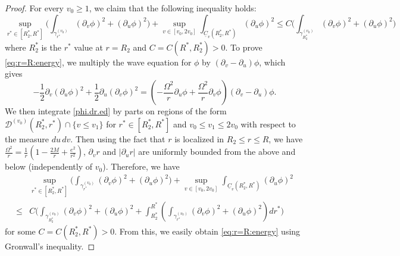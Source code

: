 \documentclass[12 pt, reqno]{amsart}
\theoremstyle{definition}
\theoremstyle{remark}
\numberwithin{equation}{section}
\newcommand{\set}[1]{\{#1\}}
\newcommand{\rd}{\partial}
\newcommand{\bb}{\Big}
\newcommand{\0}{\emptyset}
\newcommand{\gmm}{\gamma}
\newcommand{\Omg}{\Omega}
\newcommand{\calD}{\mathcal D}
\newcommand{\uC}{\underline{C}}
\begin{document}
\begin{proof}
For every $v_{0} \geq 1$, we claim that the following inequality holds:
\begin{equation} \label{eq:r=R:energy}
	\sup_{r^{\ast} \in [R_{2}^{\ast}, R^{\ast}]} \bb( \int_{\gmm^{(v_{0})}_{r^{\ast}}} (\rd_{v} \phi)^{2} + (\rd_{u} \phi)^{2} \bb)
	+ \sup_{v \in [v_{0}, 2v_{0}]} \int_{\uC_{v}(R^{\ast}_{2}, R^{\ast})} (\rd_{u} \phi)^{2} 
	\leq C \bb( \int_{\gmm^{(v_{0})}_{R^{\ast}_{2}}} (\rd_{v} \phi)^{2} + (\rd_{u} \phi)^{2} \bb)
\end{equation}
where $R^{\ast}_{2}$ is the $r^{\ast}$ value at $r = R_{2}$ and $C = C(R^{\ast}, R_{2}^{\ast}) > 0$. 
To prove \eqref{eq:r=R:energy}, we multiply the wave equation for $\phi$ by $(\rd_{v} - \rd_{u}) \phi$, which gives
\begin{equation} \label{phi.dr.ed}
	-\frac{1}{2} \rd_{v} (\rd_{u} \phi)^{2} + \frac{1}{2} \rd_{u} (\rd_{v} \phi)^{2} = (- \frac{\Omg^{2}}{r} \rd_{u} \phi + \frac{\Omg^{2}}{r} \rd_{v} \phi) (\rd_{v} - \rd_{u}) \phi.
\end{equation}
We then integrate \eqref{phi.dr.ed} by parts on regions of the form $\calD^{(v_{0})}(R^{\ast}_{2}, r^{\ast}) \cap \set{v \leq v_{1}}$ for $r^{\ast} \in [R^{\ast}_{2}, R^{\ast}]$ and $v_{0} \leq v_{1} \leq 2v_{0}$ with respect to the measure $du\,dv$. Then using the fact that $r$ is localized in $R_{2} \leq r \leq R$, we have $\frac{\Omg^{2}}{r} = \frac{1}{r}(1 - \frac{2M}{r} + \frac{e^{2}}{r^{2}})$, $\rd_{v} r$ and $|\rd_{u} r|$ are uniformly bounded from the above and below (independently of $v_{0}$). Therefore, we have
\begin{equation*} 
\begin{split}
	&\sup_{r^{\ast} \in [R_{2}^{\ast}, R^{\ast}]} \bb( \int_{\gmm^{(v_{0})}_{r^{\ast}}} (\rd_{v} \phi)^{2} + (\rd_{u} \phi)^{2} \bb)
	+ \sup_{v \in [v_{0}, 2v_{0}]} \int_{\uC_{v}(R^{\ast}_{2}, R^{\ast})} (\rd_{u} \phi)^{2} \\
	\leq &C \bb( \int_{\gmm^{(v_{0})}_{R^{\ast}_{2}}} (\rd_{v} \phi)^{2} + (\rd_{u} \phi)^{2}+\int_{R_2^{\ast}}^{R^{\ast}} (\int_{\gmm^{(v_{0})}_{r^{\ast}}} (\rd_v\phi)^2+(\rd_u\phi)^2) dr^{\ast} \bb)
\end{split}
\end{equation*}
for some $C=C(R_2^{\ast},R^{\ast})>0$. From this, we easily obtain \eqref{eq:r=R:energy} using Gronwall's inequality.


\end{proof}
\end{document}

